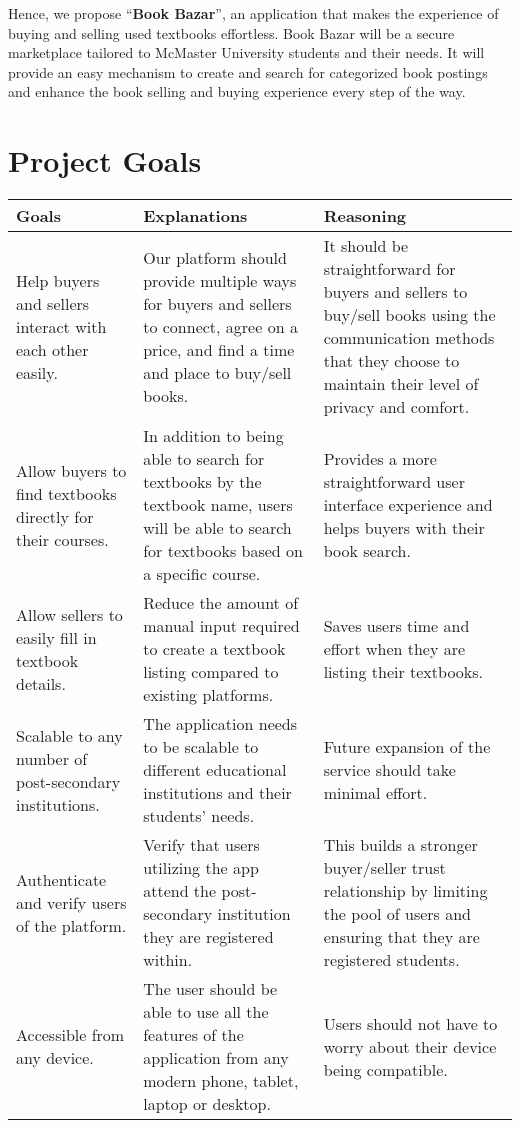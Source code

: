 \documentclass[fullpage]{article}
\newcommand{\bc}{\begin{center}}
\newcommand{\ec}{\end{center}}
\begin{document}
Hence, we propose “\textbf{Book Bazar}”, an application that makes the experience of buying and selling used textbooks effortless. Book Bazar will be a secure marketplace tailored to McMaster University students and their needs. It will provide an easy mechanism to create and search for categorized book postings and enhance the book selling and buying experience every step of the way.


\section{Project Goals}
\bc

\begin{tabular}{| p{4cm}| p{4cm}| p{4cm}|}

\hline
 \rowcolor{lightgray} 
\textbf{Goals} & \textbf{Explanations} &\textbf{Reasoning}\\
\hline
Help buyers and sellers interact with each other easily. & Our platform should provide multiple ways for buyers and sellers to connect, agree on a price, and find a time and place to buy/sell books. & It should be straightforward for buyers and sellers to buy/sell books using the communication methods that they choose to maintain their level of privacy and comfort.\\
\hline
 Allow buyers to find textbooks directly for their courses. & In addition to being able to search for textbooks by the textbook name, users will be able to search for textbooks based on a specific course. & Provides a more straightforward user interface experience and helps buyers with their book search.\\
\hline
Allow sellers to easily fill in textbook details. & Reduce the amount of manual input required to create a textbook listing compared to existing platforms. & Saves users time and effort when they are listing their textbooks.\\
\hline
 Scalable to any number of post-secondary institutions. & The application needs to be scalable to different educational institutions and their students’ needs. & Future expansion of the service should take minimal effort.\\
\hline
Authenticate and verify users of the platform. & Verify that users utilizing the app attend the post-secondary institution they are registered within. & This builds a stronger buyer/seller trust relationship by limiting the pool of users and ensuring that they are registered students.\\
\hline
Accessible from any device. & The user should be able to use all the features of the application from any modern phone, tablet, laptop or desktop. & Users should not have to worry about their device being compatible.\\
\hline

\end{tabular}
\ec
\end{document}
